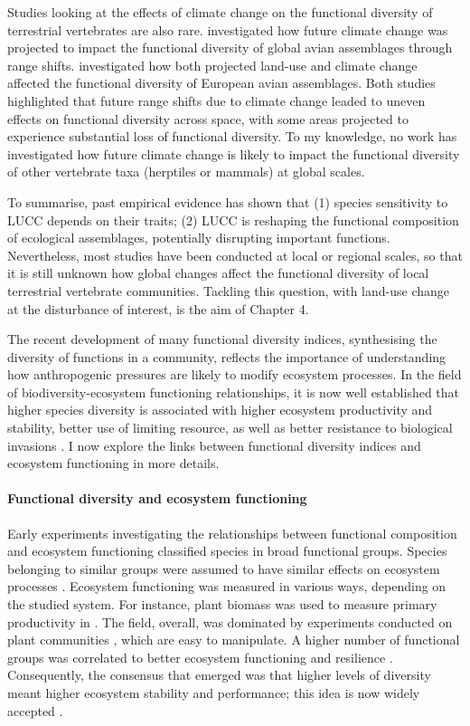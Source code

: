 Studies looking at the effects of climate change on the functional diversity of terrestrial vertebrates are also rare. \citet{BarbetMassin2015} investigated how future climate change was projected to impact the functional diversity of global avian assemblages through range shifts. \citet{Thuiller2014} investigated how both projected land-use and climate change affected the functional diversity of European avian assemblages. Both studies highlighted that future range shifts due to climate change leaded to uneven effects on functional diversity across space, with some areas projected to experience substantial loss of functional diversity. To my knowledge, no work has investigated how future climate change is likely to impact the functional diversity of other vertebrate taxa (herptiles or mammals) at global scales. 

To summarise, past empirical evidence has shown that (1) species sensitivity to LUCC depends on their traits; (2) LUCC  is reshaping the functional composition of ecological assemblages, potentially disrupting important functions. Nevertheless, most studies have been conducted at local or regional scales, so that it is still unknown how global changes affect the functional diversity of local terrestrial vertebrate communities. Tackling this question, with land-use change at the disturbance of interest, is the aim of Chapter 4. 

The recent development of many functional diversity indices, synthesising the diversity of functions in a community, reflects the importance of understanding how anthropogenic pressures are likely to modify ecosystem processes. In the field of biodiversity-ecosystem functioning relationships, it is now well established that higher species diversity is associated with higher ecosystem productivity and stability, better use of limiting resource, as well as better resistance to biological invasions \citep{Tilman2014}. I now explore the links between functional diversity indices and ecosystem functioning in more details.

\paragraph{Functional diversity and ecosystem functioning}

Early experiments investigating the relationships between functional composition and ecosystem functioning classified species in broad functional groups. Species belonging to similar groups were assumed to have similar effects on ecosystem processes \citep{Legras2018}. Ecosystem functioning was measured in various ways, depending on the studied system. For instance, plant biomass was used to measure primary productivity in \citet{Weisser2017}. The field, overall, was dominated by experiments conducted on plant communities \citep{Tilman2014}, which are easy to manipulate. A higher number of functional groups was correlated to better ecosystem functioning and resilience \citep{Tilman1994, Hector1999}. Consequently, the consensus that emerged was that higher levels of diversity meant higher ecosystem stability and performance; this idea is now widely accepted \citep{Hooper2005, Hooper2012, Oliver2015}. 

